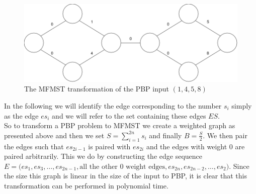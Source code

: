 \begin{figure}[ht!]
    \centering
    \includegraphics[width=0.6\linewidth]{Latex/Billeder/PBPToMFMSTExample.png}
    \caption{The MFMST transformation of the PBP input $(1,4,5,8)$}
    \label{fig:PBPToMFMSTExample}
\end{figure}
In the following we will identify the edge corresponding to the number $s_i$ simply as the edge $es_i$ and we will refer to the set containing these edges $ES$. 
\\
So to transform a PBP problem to MFMST we create a weighted graph as presented above and then we set $S=\sum_{i=1}^{2n}s_i$ and finally $B=\frac{S}{2}$. We then pair the edges such that $es_{2i-1}$ is paired with $es_{2i}$ and the edges with weight 0 are paired arbitrarily. This we do by constructing the edge sequence $E=\Big(es_1,es_3,\dots,es_{2n-1},\text{all the other 0 weight edges},es_{2n},es_{2n-2},\dots,es_{2}\Big)$. Since the size this graph is linear in the size of the input to PBP, it is clear that this transformation can be performed in polynomial time.

